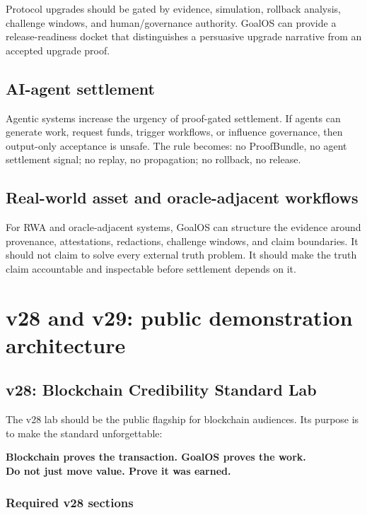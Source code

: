 Protocol upgrades should be gated by evidence, simulation, rollback analysis, challenge windows, and human/governance authority. GoalOS can provide a release-readiness docket that distinguishes a persuasive upgrade narrative from an accepted upgrade proof.

\subsection{AI-agent settlement}

Agentic systems increase the urgency of proof-gated settlement. If agents can generate work, request funds, trigger workflows, or influence governance, then output-only acceptance is unsafe. The rule becomes: no ProofBundle, no agent settlement signal; no replay, no propagation; no rollback, no release.

\subsection{Real-world asset and oracle-adjacent workflows}

For RWA and oracle-adjacent systems, GoalOS can structure the evidence around provenance, attestations, redactions, challenge windows, and claim boundaries. It should not claim to solve every external truth problem. It should make the truth claim accountable and inspectable before settlement depends on it.

\section{v28 and v29: public demonstration architecture}

\subsection{v28: Blockchain Credibility Standard Lab}

The v28 lab should be the public flagship for blockchain audiences. Its purpose is to make the standard unforgettable:

\begin{center}
{\Large\bfseries Blockchain proves the transaction. GoalOS proves the work.}\\[2pt]
{\large\bfseries Do not just move value. Prove it was earned.}
\end{center}

\subsubsection*{Required v28 sections}

